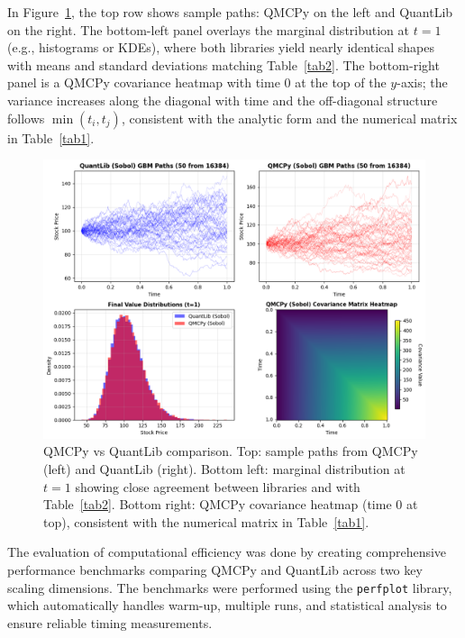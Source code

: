 

 In Figure~\ref{fig:qmcpy_quantlib_comparison}, the top row shows sample paths:
 QMCPy on the left and QuantLib on the right. The bottom-left panel overlays the
 marginal distribution at $t=1$ (e.g., histograms or KDEs), where both libraries
 yield nearly identical shapes with means and standard deviations matching
 Table~\ref{tab2}. The bottom-right panel is a QMCPy covariance heatmap with
 time 0 at the top of the $y$-axis; the variance increases along the diagonal
 with time and the off-diagonal structure follows $\min(t_i,t_j)$, consistent
 with the analytic form and the numerical matrix in Table~\ref{tab1}.

\begin{figure}[h]
\centering
\includegraphics[width=1\textwidth]{GBM/images/figure_5.png}
\caption{QMCPy vs QuantLib comparison. Top: sample paths from QMCPy (left) and
QuantLib (right). Bottom left: marginal distribution at $t=1$ showing close
agreement between libraries and with Table~\ref{tab2}. Bottom right: QMCPy
covariance heatmap (time 0 at top), consistent with the numerical matrix in
Table~\ref{tab1}.}
\label{fig:qmcpy_quantlib_comparison}
\end{figure}

The evaluation of computational efficiency was done by creating comprehensive performance
benchmarks comparing QMCPy and QuantLib across two key scaling dimensions. The
benchmarks were performed using the \texttt{perfplot} library, which
automatically handles warm-up, multiple runs, and statistical analysis to ensure
reliable timing measurements. 

